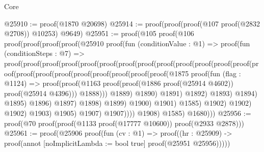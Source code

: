\begin{lexlean}{Core}
\begin{coremodule}
@25910 := proof(@1870 @20698)
@25914 := proof(proof(proof(@107 proof(@2832 @2708)) @10253) @9649)
@25951 := proof(@105
      proof(@106
          proof(proof(proof(proof(@25910
                    proof(fun (conditionValue : @1) =>
                      proof(fun (conditionSteps : @7) =>
                        proof(proof(proof(proof(proof(proof(proof(proof(proof(proof(proof(proof(proof(proof(proof(proof(proof(proof(proof(proof(proof(proof(@1875
                                                                      proof(fun (flag : @1124) =>
                                                                        proof(proof(@1163
                                                                              proof(proof(@1886
                                                                                    proof(@25914
                                                                                        @4602))
                                                                                  proof(@25914
                                                                                      @4396)))
                                                                            @1888)))
                                                                    @1889)
                                                                  @1890)
                                                                @1891)
                                                              @1892)
                                                            @1893)
                                                          @1894)
                                                        @1895)
                                                      @1896)
                                                    @1897)
                                                  @1898)
                                                @1899)
                                              @1900)
                                            @1901)
                                          @1585)
                                        @1902)
                                      @1902)
                                    @1902)
                                  @1903)
                                @1905)
                              @1907)
                            @1907))))
                  @1908)
                @1585)
              @1680)))
@25956 := proof(@70 proof(proof(@1133 proof(@17777 @10600)) proof(@2933 @2878)))
@25961 := proof(@25906
      proof(fun (cv : @1) =>
        proof((hr : @25909) -> proof(annot [noImplicitLambda := bool true] proof(@25951 @25956)))))

\end{coremodule}
\end{lexlean}
